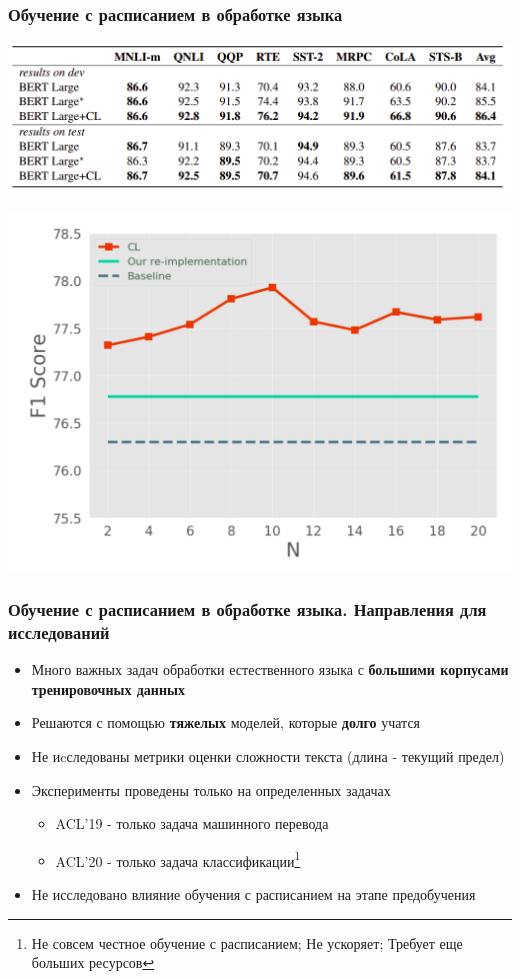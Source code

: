 \documentclass{beamer}
\begin{document}
\begin{frame}
	\frametitle{Обучение с расписанием в обработке языка}
	\begin{center}
		\includegraphics[scale=0.3]{acl20_results}
	\end{center}

	\begin{center}
		\includegraphics[scale=0.3]{acl20_results2}
	\end{center}

\end{frame}

\begin{frame}
	\frametitle{Обучение с расписанием в обработке языка. Направления для исследований}
	\begin{itemize}
		\item Много важных задач обработки естественного языка с {\bf большими корпусами тренировочных данных}
		\item Решаются с помощью {\bf тяжелых} моделей, которые {\bf долго} учатся
		\item Не иcследованы метрики оценки сложности текста (длина - текущий предел)
		\item Эксперименты проведены только на определенных задачах
			\begin{itemize}
				\item ACL'19 - только задача машинного перевода
				\item ACL'20 - только задача классификации\footnote[1]{Не совсем честное обучение с расписанием; Не ускоряет; Требует еще больших ресурсов}
			\end{itemize}
		\item Не исследовано влияние обучения с расписанием на этапе предобучения
	\end{itemize}
\end{frame}
\end{document}
